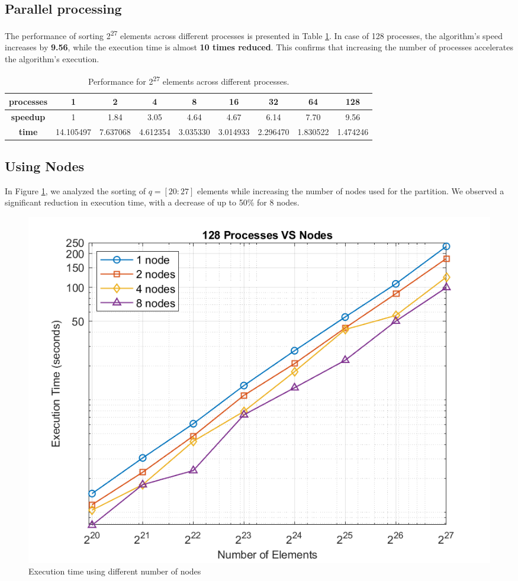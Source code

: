 \documentclass{article}
\begin{document}
\subsection{Parallel processing}
The performance of sorting 2\textsuperscript{27} elements across different processes is presented in Table \ref{tab:acceleration}. In case of 128 processes, the algorithm's speed increases by \textbf{9.56}, while the execution time is almost \textbf{10 times reduced}. This confirms that increasing the number of processes accelerates the algorithm's execution.
\begin{table}[h!]
\centering
\begin{tabular}{|c|c|c|c|c|c|c|c|c|}
\hline
\textbf{processes} & 1 & 2 & 4 & 8 & 16 & 32 & 64 & 128 \\
\hline
\textbf{speedup} & 1 & 1.84 & 3.05 & 4.64 & 4.67 & 6.14& 7.70 & 9.56 \\
\hline
\textbf{time} & 14.105497 & 7.637068 & 4.612354 & 3.035330 & 3.014933 & 2.296470 & 1.830522 & 1.474246 \\
\hline
\end{tabular}
\caption{Performance for 2\textsuperscript{27} elements across different processes.}
\label{tab:acceleration}
\end{table}

\subsection{Using Nodes}
In Figure \ref{fig:proc vs nodes}, we analyzed the sorting of $q = [20:27]$ elements while increasing the number of nodes used for the partition. We observed a significant reduction in execution time, with a decrease of up to 50\% for 8 nodes.

\begin{figure}[h!]
    \centering
    \includegraphics[width=1\linewidth]{execution_time_vs_elements.png}
    \caption{Execution time using different number of nodes}
    \label{fig:proc vs nodes}
\end{figure}
\end{document}
